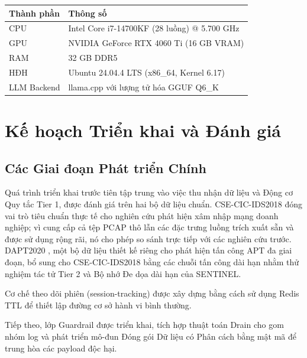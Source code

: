 \documentclass[12pt,a4paper]{article}
\begin{document}
\begin{table}[H]
    \centering
    \begin{tabular}{ll}
        \toprule
        \textbf{Thành phần} & \textbf{Thông số}                            \\
        \midrule
        CPU                 & Intel Core i7-14700KF (28 luồng) @ 5.700 GHz \\
        GPU                 & NVIDIA GeForce RTX 4060 Ti (16 GB VRAM)      \\
        RAM                 & 32 GB DDR5                                   \\
        HĐH                 & Ubuntu 24.04.4 LTS (x86\_64, Kernel 6.17)    \\
        LLM Backend         & llama.cpp với lượng tử hóa GGUF Q6\_K         \\
        \bottomrule
    \end{tabular}
\end{table}

\newpage
\section{Kế hoạch Triển khai và Đánh giá}

\subsection{Các Giai đoạn Phát triển Chính}
Quá trình triển khai trước tiên tập trung vào việc thu nhận dữ liệu và Động cơ Quy tắc Tier 1, được đánh giá trên hai bộ dữ liệu chuẩn. CSE-CIC-IDS2018 \cite{sharafaldin2018} đóng vai trò tiêu chuẩn thực tế cho nghiên cứu phát hiện xâm nhập mạng doanh nghiệp; vì cung cấp cả tệp PCAP thô lẫn các đặc trưng luồng trích xuất sẵn và được sử dụng rộng rãi, nó cho phép so sánh trực tiếp với các nghiên cứu trước. DAPT2020 \cite{dapt2020}, một bộ dữ liệu thiết kế riêng cho phát hiện tấn công APT đa giai đoạn, bổ sung cho CSE-CIC-IDS2018 bằng các chuỗi tấn công dài hạn nhằm thử nghiệm tác tử Tier 2 và Bộ nhớ Đe dọa dài hạn của SENTINEL.

Cơ chế theo dõi phiên (session-tracking) được xây dựng bằng cách sử dụng Redis TTL để thiết lập đường cơ sở hành vi bình thường.

Tiếp theo, lớp Guardrail được triển khai, tích hợp thuật toán Drain cho gom nhóm log và phát triển mô-đun Đóng gói Dữ liệu có Phân cách bằng mật mã để trung hòa các payload độc hại.
\end{document}

